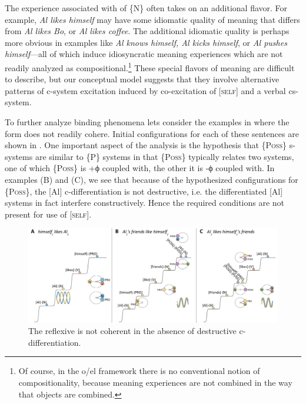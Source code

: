   The  experience associated with  of \{N\} often takes on an additional flavor. For example, \textit{Al likes himself} may have some idiomatic quality of meaning that differs from \textit{Al likes Bo}, or \textit{Al likes coffee}. The additional idiomatic quality is perhaps more obvious in examples like \textit{Al knows himself, Al kicks himself}, or \textit{Al pushes himself}—all of which induce idiosyncratic meaning experiences which are not readily analyzed as compositional.\footnote{Of course, in the o/el framework there is no conventional notion of compositionality, because meaning experiences are not combined in the way that objects are combined.} These special flavors of meaning are difficult to describe, but our conceptual model suggests that they involve alternative patterns of c-system excitation induced by co-excitation of  [\textsc{self}] and a verbal cs-system.

  To further analyze binding phenomena lets consider the examples in  where the  form does not readily cohere. Initial configurations for each of these sentences are shown in {}. One important aspect of the analysis is the hypothesis that \{P\textsc{oss}\} s-systems are similar to \{P\} systems in that \{P\textsc{oss}\} typically relates two systems, one of which \{P\textsc{oss}\} is +ϕ coupled with, the other it is -ϕ coupled with. In examples (B) and (C), we see that because of the hypothesized configurations for \{P\textsc{oss}\}, the [Al] c-differentiation is not destructive, i.e. the differentiated [Al] systems in fact interfere constructively. Hence the required conditions are not present for use of [\textsc{self}]. 

\ea\label{ex:7:16}
\z
\z

\begin{figure}
\includegraphics[width=\textwidth]{figures/Tilsen-img157.png}
\caption{The reflexive is not coherent in the absence of destructive c-differentiation.}
\label{fig:7:13}
\end{figure}
 

